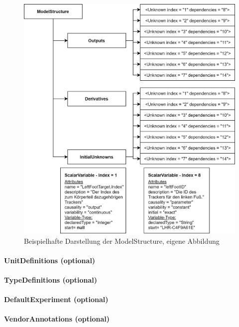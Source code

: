 \begin{figure}[h]
	\centering
	\includegraphics[width=0.85\linewidth]{Bilder/A31_ModelStructure}
	\caption{Beispielhafte Darstellung der ModelStructure, eigene Abbildung}
	\label{fig:ModelStructure}
\end{figure}

\paragraph{UnitDefinitions (optional)}\label{sec:UnitDefinitions}

\paragraph{TypeDefinitions (optional)}\label{sec:TypeDefinitions}

\paragraph{DefaultExperiment (optional)}\label{sec:DefaultExperiment}

\paragraph{VendorAnnotations (optional)}\label{sec:VendorAnnotations}

